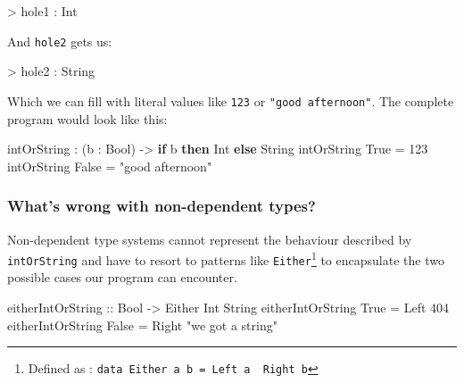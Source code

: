 \documentclass[
]{article}
\newenvironment{Shaded}{}{}
\newcommand{\DataTypeTok}[1]{\textcolor[rgb]{0.56,0.13,0.00}{#1}}
\newcommand{\DecValTok}[1]{\textcolor[rgb]{0.25,0.63,0.44}{#1}}
\newcommand{\KeywordTok}[1]{\textcolor[rgb]{0.00,0.44,0.13}{\textbf{#1}}}
\newcommand{\NormalTok}[1]{#1}
\newcommand{\OperatorTok}[1]{\textcolor[rgb]{0.40,0.40,0.40}{#1}}
\newcommand{\OtherTok}[1]{\textcolor[rgb]{0.00,0.44,0.13}{#1}}
\newcommand{\StringTok}[1]{\textcolor[rgb]{0.25,0.44,0.63}{#1}}
\begin{document}
\begin{Shaded}
\begin{Highlighting}[]
\OperatorTok{\textgreater{}}\NormalTok{ hole1 }\OperatorTok{:} \DataTypeTok{Int}
\end{Highlighting}
\end{Shaded}

And \texttt{hole2} gets us:

\begin{Shaded}
\begin{Highlighting}[]
\OperatorTok{\textgreater{}}\NormalTok{ hole2 }\OperatorTok{:} \DataTypeTok{String}
\end{Highlighting}
\end{Shaded}

Which we can fill with literal values like \texttt{123} or
\texttt{"good\ afternoon"}. The complete program would look like this:

\begin{Shaded}
\begin{Highlighting}[]
\NormalTok{intOrString }\OperatorTok{:}\NormalTok{ (b }\OperatorTok{:} \DataTypeTok{Bool}\NormalTok{) }\OtherTok{{-}\textgreater{}} \KeywordTok{if}\NormalTok{ b }\KeywordTok{then} \DataTypeTok{Int} \KeywordTok{else} \DataTypeTok{String}
\NormalTok{intOrString }\DataTypeTok{True} \OtherTok{=} \DecValTok{123}
\NormalTok{intOrString }\DataTypeTok{False} \OtherTok{=} \StringTok{"good afternoon"}
\end{Highlighting}
\end{Shaded}

\hypertarget{whats-wrong-with-non-dependent-types}{%
\subsubsection{What's wrong with non-dependent
types?}\label{whats-wrong-with-non-dependent-types}}

Non-dependent type systems cannot represent the behaviour described by
\texttt{intOrString} and have to resort to patterns like
\texttt{Either}\footnote{Defined as :
  \texttt{data\ Either\ a\ b\ =\ Left\ a\ \textbar{}\ Right\ b}} to
encapsulate the two possible cases our program can encounter.

\begin{Shaded}
\begin{Highlighting}[]
\OtherTok{eitherIntOrString ::} \DataTypeTok{Bool} \OtherTok{{-}\textgreater{}} \DataTypeTok{Either} \DataTypeTok{Int} \DataTypeTok{String}
\NormalTok{eitherIntOrString }\DataTypeTok{True} \OtherTok{=} \DataTypeTok{Left} \DecValTok{404}
\NormalTok{eitherIntOrString }\DataTypeTok{False} \OtherTok{=} \DataTypeTok{Right} \StringTok{"we got a string"}
\end{Highlighting}
\end{Shaded}
\end{document}
